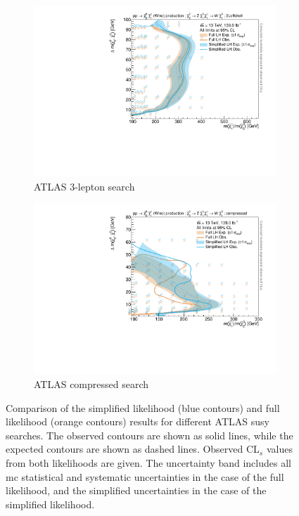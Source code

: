 \begin{figure}
\begin{subfigure}[b]{0.5\textwidth}
		\centering\includegraphics[width=\textwidth]{exclusion_3Loffshell_CLs_noLabel}
		\caption{ATLAS 3-lepton search\label{fig:results_3Loffshell_CLs}}
	\end{subfigure}\hfill
	\begin{subfigure}[b]{0.5\textwidth}
		\centering\includegraphics[width=\textwidth]{exclusion_compressed_CLs_noLabel}
		\caption{ATLAS compressed search~\cite{SUSY-2018-16}\label{fig:results_compressed_CLs}}
	\end{subfigure}\hfill
	\caption{Comparison of the simplified likelihood (blue contours) and full likelihood (orange contours) results for different ATLAS \gls{susy} searches. The observed contours are shown as solid lines, while the expected contours are shown as dashed lines. Observed CL$_s$ values from both likelihoods are given. The uncertainty band includes all \gls{mc} statistical and systematic uncertainties in the case of the full likelihood, and the simplified uncertainties in the case of the simplified likelihood.}\label{fig:results_analyses_CLs}
\end{figure}



